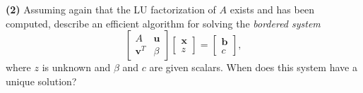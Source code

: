 \documentclass[a4paper,11pt]{article}
\begin{document}
\noindent \textbf{(2)} Assuming again that the LU factorization of $A$ exists and has been computed, describe an efficient algorithm for solving the \textit{bordered system}
\begin{equation}\label{key}
	\begin{bmatrix}
		A &  \textbf{u} \\ 
		\textbf{v}^T & \beta 
	\end{bmatrix}
	\begin{bmatrix}
		\textbf{x} \\ 
		z
	\end{bmatrix}
	=
	\begin{bmatrix}
		\textbf{b} \\ 
		c
	\end{bmatrix},
\end{equation}
where $z$ is unknown and $\beta$ and $c$ are given scalars. When does this system have a unique solution?
\end{document}

